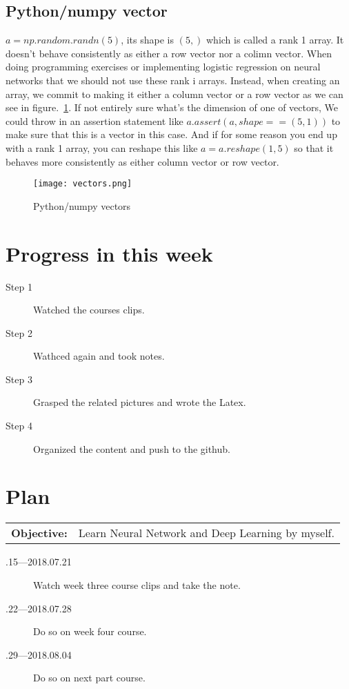 \documentclass[a4paper]{article}
\begin{document}
\subsection{Python/numpy vector}
$a=np.random.randn(5)$, its shape is $(5,)$ which is called a rank 1 array. It doesn't behave consistently as either a row vector nor a colimn vector. When doing programming exercises or implementing logistic regression on neural networks that we should not use these rank i arrays. Instead, when creating an array, we commit to making it either a column vector or a row vector as we can see in figure.~\ref{fig:vectors}. If not entirely sure what's the dimension of one of vectors, We could throw in an assertion statement like $a.assert(a,shape==(5,1))$ to make sure that this is a vector in this case. And if for some reason you end up with a rank 1 array, you can reshape this like $a=a.reshape(1,5)$ so that it behaves more consistently as either column vector or row vector.


\begin{figure}[!htp]
\begin{center}
   \texttt{[image: vectors.png]}
\end{center}
   \caption{Python/numpy vectors}
\label{fig:vectors}
\end{figure}

\section{Progress in this week}

\begin{description}
\item [Step 1]
Watched the courses clips.
\item[Step 2]
Wathced again and took notes.
\item[Step 3]
Grasped the related pictures and wrote the Latex.
\item[Step 4]
Organized the content and push to the github.
\end{description}


\section{Plan}

\begin{tabular}{rl}
	\textbf{Objective:} & Learn Neural Network and Deep Learning by myself. \\
\end{tabular}

\begin{description}
    \item[.15---2018.07.21] Watch week three course clips and take the note.
    \item[.22---2018.07.28] Do so on week four course.
    \item[.29---2018.08.04] Do so on next part course.
\end{description}



\end{document}
